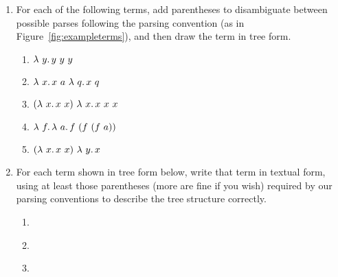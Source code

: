 \begin{enumerate}

  \item For each of the following terms, add parentheses to disambiguate
between possible parses following the parsing convention (as in
Figure~\ref{fig:exampleterms}), and then draw the term in tree form.

\begin{enumerate}
\item $\lambda\ y.\, y\ y\ y$
\item $\lam{x}{x\ a\ \lam{q}{x\ q}}$
\item $(\lam{x}{x\ x})\ \lam{x}{x\ x\ x}$
\item $\lam{f}{\lam{a}{f\ (f\ (f\ a))}}$
\item $(\lam{x}{x\ x})\ \lam{y}{x}$
\end{enumerate}

\item For each term shown in tree form below, write that term in
  textual form, using at least those parentheses (more are fine if you
  wish) required by our parsing conventions to describe the tree
  structure correctly.


  \begin{enumerate}
  \item

    \


  \item

    \


  \item

    \




\end{enumerate}
\end{enumerate}
